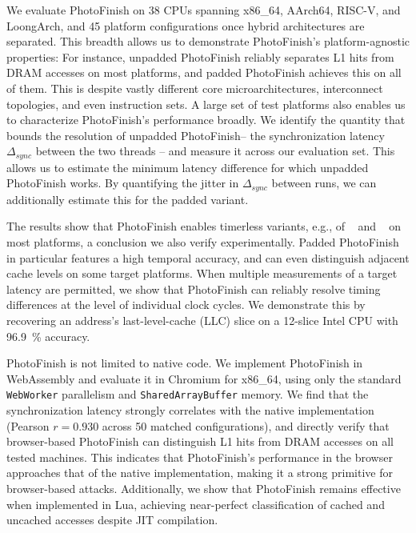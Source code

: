\documentclass[letterpaper,twocolumn,10pt]{article} %
\newcommand{\code}[1]{\texttt{#1}\xspace}
\newcommand{\AttackName}{PhotoFinish\xspace}
\newcommand{\PlatformCount}{38\xspace}
\newcommand{\rdelta}[1]{$\Delta_{#1}$}
\begin{document}
We evaluate \AttackName on \PlatformCount CPUs spanning x86\_64, AArch64, RISC-V, and LoongArch, and \num{45} platform configurations once hybrid architectures are separated.
This breadth allows us to demonstrate \AttackName's platform-agnostic properties:
For instance, unpadded \AttackName reliably separates L1 hits from DRAM accesses on most platforms, and padded \AttackName achieves this on all of them.
This is despite vastly different core microarchitectures, interconnect topologies, and even instruction sets.
A large set of test platforms also enables us to characterize \AttackName's performance broadly.
We identify the quantity that bounds the resolution of unpadded \AttackName -- the synchronization latency \rdelta{sync} between the two threads -- and measure it across our evaluation set.
This allows us to estimate the minimum latency difference for which unpadded \AttackName works.
By quantifying the jitter in \rdelta{sync} between runs, we can additionally estimate this for the padded variant.

The results show that \AttackName enables timerless variants, e.g., of \FlushReload~\cite{Yarom2014Flush} and \EvictReload~\cite{Lipp2016} on most platforms, a conclusion we also verify experimentally.
Padded \AttackName in particular features a high temporal accuracy, and can even distinguish adjacent cache levels on some target platforms.
When multiple measurements of a target latency are permitted, we show that \AttackName can reliably resolve timing differences at the level of individual clock cycles.
We demonstrate this by recovering an address's last-level-cache (LLC) slice on a \num{12}-slice Intel CPU with \SI{96.9}{\percent} accuracy.

\AttackName is not limited to native code.
We implement \AttackName in WebAssembly and evaluate it in Chromium for x86\_64, using only the standard \code{WebWorker} parallelism and \code{SharedArrayBuffer} memory.
We find that the synchronization latency strongly correlates with the native implementation (Pearson $r = \num{0.930}$ across \num{50} matched configurations), and directly verify that browser-based \AttackName can distinguish L1 hits from DRAM accesses on all tested machines.
This indicates that \AttackName's performance in the browser approaches that of the native implementation, making it a strong primitive for browser-based attacks.
Additionally, we show that \AttackName remains effective when implemented in Lua, achieving near-perfect classification of cached and uncached accesses despite JIT compilation.
\end{document}
